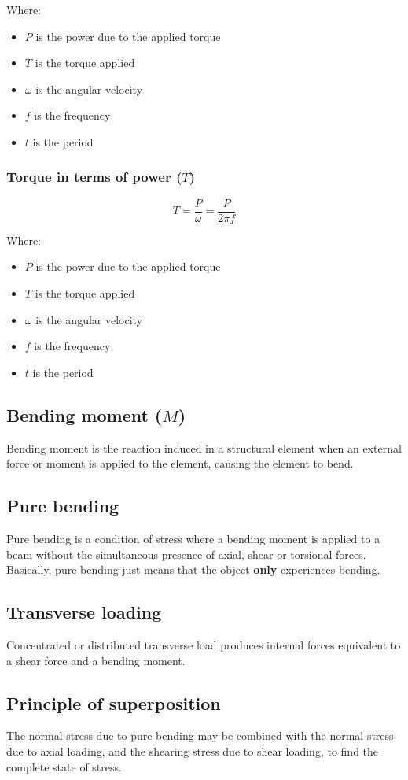\documentclass[11pt]{article}
\begin{document}
Where:
\begin{itemize}
\item \(P\) is the power due to the applied torque
\item \(T\) is the torque applied
\item \(\omega\) is the angular velocity
\item \(f\) is the frequency
\item \(t\) is the period
\end{itemize}
\subsubsection{Torque in terms of power (\(T\))}
\label{sec:org3be48c9}
\[T = \frac{P}{\omega} = \frac{P}{2 \pi f}\]

Where:
\begin{itemize}
\item \(P\) is the power due to the applied torque
\item \(T\) is the torque applied
\item \(\omega\) is the angular velocity
\item \(f\) is the frequency
\item \(t\) is the period
\end{itemize}
\subsection{Bending moment (\(M\))}
\label{sec:orgda23c2b}
Bending moment is the reaction induced in a structural element when an external force or moment is applied to the element, causing the element to bend.
\subsection{Pure bending}
\label{sec:org71fe9bc}
Pure bending is a condition of stress where a bending moment is applied to a beam without the simultaneous presence of axial, shear or torsional forces. Basically, pure bending just means that the object \textbf{only} experiences bending.
\subsection{Transverse loading}
\label{sec:org93e0eec}
Concentrated or distributed transverse load produces internal forces equivalent to a shear force and a bending moment.
\subsection{Principle of superposition}
\label{sec:orgc2cbf65}
The normal stress due to pure bending may be combined with the normal stress due to axial loading, and the shearing stress due to shear loading, to find the complete state of stress.
\end{document}
